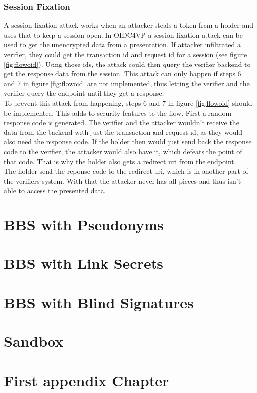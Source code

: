 \documentclass[
	a4paper               %
	,BCOR=0mm            %
	,bibliography=totoc   %
	,listof=totoc         %
	,monolingual
	,twoside=false
]{bfhthesis}              %
\begin{document}
\subsection{Session Fixation}
A session fixation attack works when an attacker steals a token from a holder and uses that to keep a session open.
In OIDC4VP a session fixation attack can be used to get the unencrypted data from a presentation.
If attacker infiltrated a verifier, they could get the transaction id and request id for a session (see figure \ref{fig:flowoid}).
Using those ids, the attack could then query the verifier backend to get the response data from the session.
This attack can only happen if steps 6 and 7 in figure \ref{fig:flowoid} are not implemented, thus letting the verifier and the verifier query the endpoint until they get a response.\\
To prevent this attack from happening, steps 6 and 7 in figure \ref{fig:flowoid} should be implemented. This adds to security features to the flow.
First a random response code is generated. The verifier and the attacker wouldn't receive the data from the backend with just the transaction and request id, as they would also need the response code. 
If the holder then would just send back the response code to the verifier, the attacker would also have it, which defeats the point of that code. That is why the holder also gets a redirect uri from the endpoint.\\
The holder send the reponse code to the redirect uri, which is in another part of the verifiers system. With that the attacker never has all pieces and thus isn't able to access the presented data.


\chapter{BBS with Pseudonyms}
\label{chap:Pseudonyms}

\chapter{BBS with Link Secrets}
\label{chap:linksecrets}

\chapter{BBS with Blind Signatures}
\label{chap:blindsignatures}


\chapter{Sandbox}

\appendix


\chapter{First appendix Chapter}



\end{document}
